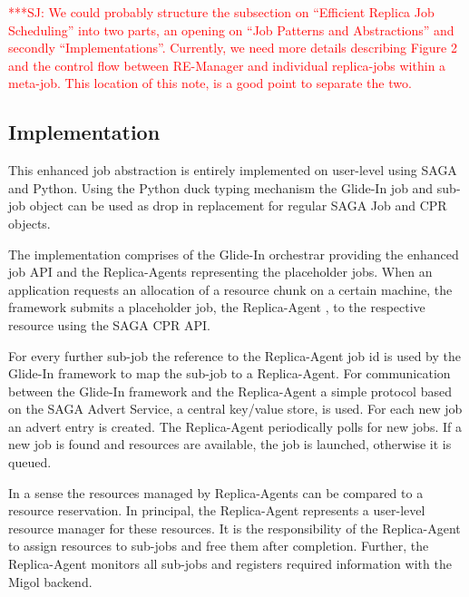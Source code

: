 \documentclass{rspublic}
\newcommand{\jhanote}[1]{ {\textcolor{red} { ***SJ: #1 }}}
\newcommand{\jhanote}[1]{}
\newcommand{\glidein}[1]{Glide-In }
\newcommand{\replicaagent}[1]{Replica-Agent }
\newcommand{\remanager}[1]{RE-Manager }
\begin{document}
\jhanote{We could probably structure the subsection on ``Efficient
  Replica Job Scheduling'' into two parts, an opening on ``Job
  Patterns and Abstractions'' and secondly
  ``Implementations''. Currently, we need more details describing
  Figure 2 and the control flow between \remanager\ and individual
  replica-jobs within a meta-job. This location of this note, is a
  good point to separate the two.}   
  
  
\subsection{Implementation}         
 
This enhanced job abstraction is entirely implemented on user-level 
using SAGA and Python. Using the Python duck typing mechanism the 
\glidein\ job and sub-job object can 
be used as drop in replacement for regular SAGA Job and CPR objects.
                                                          
The implementation comprises of the \glidein\ orchestrar providing the 
enhanced job API and the Replica-Agents
representing the placeholder jobs. When an application requests an 
allocation of a resource chunk on a certain machine, the framework submits a
placeholder job, the \replicaagent\ , to the respective resource
using the SAGA CPR API. 

For every further sub-job the reference to the \replicaagent\ job id 
is used by the \glidein\ framework to map
the sub-job to a Replica-Agent.  For communication between the \glidein\ framework
and the \replicaagent\ a simple protocol based on the SAGA
Advert Service, a central key/value store, is used.  For each new job an advert
entry is created. The \replicaagent\ periodically polls for new jobs.
If a new job is found and resources are available, the job is launched,
otherwise it is queued.
           
In a sense the resources managed by Replica-Agents can be compared to 
a resource reservation. In principal, the Replica-Agent represents 
a user-level resource manager for these resources. It is the responsibility 
of the \replicaagent\ 
to assign resources to sub-jobs and free them after completion. Further,
the \replicaagent\ monitors all sub-jobs and registers required
information with the Migol backend.
\end{document}
